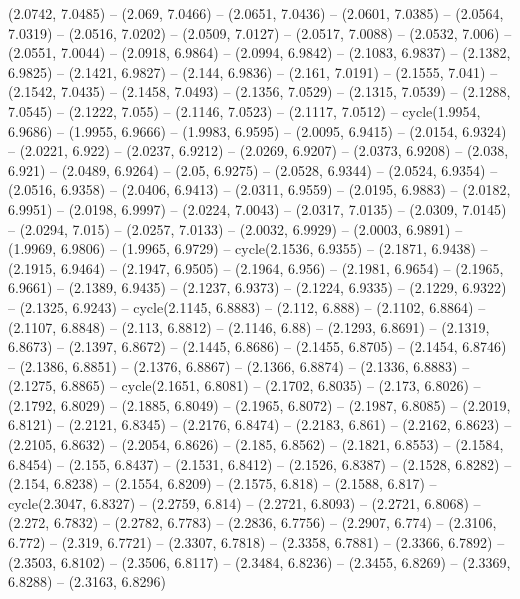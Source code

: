 {  (2.0742, 7.0485) -- (2.069, 7.0466) -- (2.0651, 7.0436) -- (2.0601, 7.0385) --
   (2.0564, 7.0319) -- (2.0516, 7.0202) -- (2.0509, 7.0127) -- (2.0517, 7.0088) 
  -- (2.0532, 7.006) -- (2.0551, 7.0044) -- (2.0918, 6.9864) -- (2.0994, 6.9842)
   -- (2.1083, 6.9837) -- (2.1382, 6.9825) -- (2.1421, 6.9827) -- (2.144, 
  6.9836) -- (2.161, 7.0191) -- (2.1555, 7.041) -- (2.1542, 7.0435) -- (2.1458, 
  7.0493) -- (2.1356, 7.0529) -- (2.1315, 7.0539) -- (2.1288, 7.0545) -- 
  (2.1222, 7.055) -- (2.1146, 7.0523) -- (2.1117, 7.0512) -- cycle(1.9954, 
  6.9686) -- (1.9955, 6.9666) -- (1.9983, 6.9595) -- (2.0095, 6.9415) -- 
  (2.0154, 6.9324) -- (2.0221, 6.922) -- (2.0237, 6.9212) -- (2.0269, 6.9207) --
   (2.0373, 6.9208) -- (2.038, 6.921) -- (2.0489, 6.9264) -- (2.05, 6.9275) -- 
  (2.0528, 6.9344) -- (2.0524, 6.9354) -- (2.0516, 6.9358) -- (2.0406, 6.9413) 
  -- (2.0311, 6.9559) -- (2.0195, 6.9883) -- (2.0182, 6.9951) -- (2.0198, 
  6.9997) -- (2.0224, 7.0043) -- (2.0317, 7.0135) -- (2.0309, 7.0145) -- 
  (2.0294, 7.015) -- (2.0257, 7.0133) -- (2.0032, 6.9929) -- (2.0003, 6.9891) --
   (1.9969, 6.9806) -- (1.9965, 6.9729) -- cycle(2.1536, 6.9355) -- (2.1871, 
  6.9438) -- (2.1915, 6.9464) -- (2.1947, 6.9505) -- (2.1964, 6.956) -- (2.1981,
   6.9654) -- (2.1965, 6.9661) -- (2.1389, 6.9435) -- (2.1237, 6.9373) -- 
  (2.1224, 6.9335) -- (2.1229, 6.9322) -- (2.1325, 6.9243) -- cycle(2.1145, 
  6.8883) -- (2.112, 6.888) -- (2.1102, 6.8864) -- (2.1107, 6.8848) -- (2.113, 
  6.8812) -- (2.1146, 6.88) -- (2.1293, 6.8691) -- (2.1319, 6.8673) -- (2.1397, 
  6.8672) -- (2.1445, 6.8686) -- (2.1455, 6.8705) -- (2.1454, 6.8746) -- 
  (2.1386, 6.8851) -- (2.1376, 6.8867) -- (2.1366, 6.8874) -- (2.1336, 6.8883) 
  -- (2.1275, 6.8865) -- cycle(2.1651, 6.8081) -- (2.1702, 6.8035) -- (2.173, 
  6.8026) -- (2.1792, 6.8029) -- (2.1885, 6.8049) -- (2.1965, 6.8072) -- 
  (2.1987, 6.8085) -- (2.2019, 6.8121) -- (2.2121, 6.8345) -- (2.2176, 6.8474) 
  -- (2.2183, 6.861) -- (2.2162, 6.8623) -- (2.2105, 6.8632) -- (2.2054, 6.8626)
   -- (2.185, 6.8562) -- (2.1821, 6.8553) -- (2.1584, 6.8454) -- (2.155, 6.8437)
   -- (2.1531, 6.8412) -- (2.1526, 6.8387) -- (2.1528, 6.8282) -- (2.154, 
  6.8238) -- (2.1554, 6.8209) -- (2.1575, 6.818) -- (2.1588, 6.817) -- 
  cycle(2.3047, 6.8327) -- (2.2759, 6.814) -- (2.2721, 6.8093) -- (2.2721, 
  6.8068) -- (2.272, 6.7832) -- (2.2782, 6.7783) -- (2.2836, 6.7756) -- (2.2907,
   6.774) -- (2.3106, 6.772) -- (2.319, 6.7721) -- (2.3307, 6.7818) -- (2.3358, 
  6.7881) -- (2.3366, 6.7892) -- (2.3503, 6.8102) -- (2.3506, 6.8117) -- 
  (2.3484, 6.8236) -- (2.3455, 6.8269) -- (2.3369, 6.8288) -- (2.3163, 6.8296) 
}
